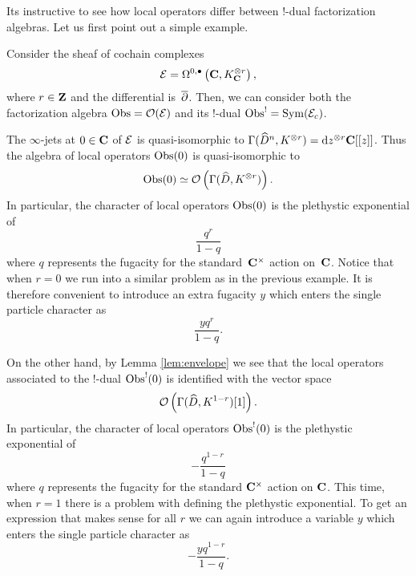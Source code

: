 Its instructive to see how local operators differ between $!$-dual factorization algebras.
Let us first point out a simple example. 
\begin{eg}
Consider the sheaf of cochain complexes
\[
\mathcal E = \Omega^{0,\bullet}\left(\mathbf{C}, K_{\mathbf{C}}^{\otimes r}\right),
\]
where $r \in \mathbf{Z}$ and the differential is~$\overline{\partial}$. 
Then, we can consider both the factorization algebra $\operatorname{Obs} = \mathcal O(\mathcal E)$ and its $!$-dual $\operatorname{Obs}^! = \operatorname{Sym}(\mathcal E_c)$. 

The $\infty$-jets at $0 \in \mathbf{C}$ of $\mathcal E$ is quasi-isomorphic to $\Gamma(\widehat{D}^n, K^{\otimes r}) = {\rm d} z^{\otimes r} \mathbf{C}[[z]]$. 
Thus the algebra of local operators $\operatorname{Obs}(0)$ is quasi-isomorphic to 
\[
\operatorname{Obs}(0) \simeq \mathcal O \left(\Gamma(\widehat{D}, K^{\otimes r})\right) .
\]
In particular, the character of local operators $\operatorname{Obs}(0)$ is the plethystic exponential of
\[
\frac{q^{r}}{1-q} 
\]
where $q$ represents the fugacity for the standard~$\mathbf{C}^\times$ action on~$\mathbf{C}$.
Notice that when $r = 0$ we run into a similar problem as in the previous example. 
It is therefore convenient to introduce an extra fugacity $y$ which enters the single particle character as
\[
\frac{y q^{r}}{1-q}  .
\]



On the other hand, by Lemma \ref{lem:envelope} we see that the local operators associated to the $!$-dual $\operatorname{Obs}^!(0)$ is identified with the vector space
\[
\mathcal O\left(\Gamma(\widehat{D}, K^{1-r})[1]\right) .
\]
In particular, the character of local operators $\operatorname{Obs}^!(0)$ is the plethystic exponential of
\[
-\frac{q^{1-r}}{1-q} 
\]
where $q$ represents the fugacity for the standard $\mathbf{C}^\times$ action on $\mathbf{C}$.
This time, when $r=1$ there is a problem with defining the plethystic exponential. 
To get an expression that makes sense for all $r$ we can again introduce a variable $y$ which enters the single particle character as
\[
- \frac{y q^{1-r}}{1-q} .
\]
\end{eg}

